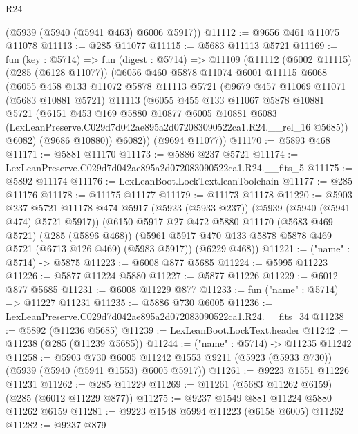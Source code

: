 \begin{lexlean}{R24}
\begin{coremodule}
    (@5939 (@5940 (@5941 @463) @6006 @5917))
@11112 := @9656 @461 @11075 @11078
@11113 := @285 @11077
@11115 := @5683 @11113 @5721
@11169 := fun (key : @5714) =>
  fun (digest : @5714) =>
  @11109
    (@11112
      (@6002 @11115)
      (@285 (@6128 @11077))
      (@6056
        @460
        @5878
        @11074
        @6001
        @11115
        @6068
        (@6055
          @458
          @133
          @11072
          @5878
          @11113
          @5721
          (@9679
            @457
            @11069
            @11071
            (@5683 @10881 @5721)
            @11113
            (@6055
              @455
              @133
              @11067
              @5878
              @10881
              @5721
              (@6151
                @453
                @169
                @5880
                @10877
                @6005
                @10881
                @6083
                (LexLeanPreserve.C029d7d042ae895a2d072083090522ca1.R24.__rel_16 @5685))
              @6082)
            (@9686 @10880))
          @6082))
      (@9694 @11077))
@11170 := @5893 @468
@11171 := @5881 @11170
@11173 := @5886 @237 @5721
@11174 := LexLeanPreserve.C029d7d042ae895a2d072083090522ca1.R24.__fits_5
@11175 := @5892 @11174
@11176 := LexLeanBoot.LockText.leanToolchain
@11177 := @285 @11176
@11178 := @11175 @11177
@11179 := @11173 @11178
@11220 := @5903
    @237
    @5721
    @11178
    @474
    @5917
    (@5923 (@5933 @237))
    (@5939 (@5940 (@5941 @474) @5721 @5917))
    (@6150
      @5917
      @27
      @472
      @5880
      @11170
      (@5683 @469 @5721)
      (@285 (@5896 @468))
      (@5961 @5917 @470 @133 @5878 @5878 @469 @5721 (@6713 @126 @469) (@5983 @5917))
      (@6229 @468))
@11221 := ("name" : @5714) -> @5875
@11223 := @6008 @877 @5685
@11224 := @5995 @11223
@11226 := @5877 @11224 @5880
@11227 := @5877 @11226
@11229 := @6012 @877 @5685
@11231 := @6008 @11229 @877
@11233 := fun ("name" : @5714) => @11227 @11231
@11235 := @5886 @730 @6005
@11236 := LexLeanPreserve.C029d7d042ae895a2d072083090522ca1.R24.__fits_34
@11238 := @5892 (@11236 @5685)
@11239 := LexLeanBoot.LockText.header
@11242 := @11238 (@285 (@11239 @5685))
@11244 := ("name" : @5714) -> @11235 @11242
@11258 := @5903
    @730
    @6005
    @11242
    @1553
    @9211
    (@5923 (@5933 @730))
    (@5939 (@5940 (@5941 @1553) @6005 @5917))
@11261 := @9223 @1551 @11226 @11231
@11262 := @285 @11229
@11269 := @11261 (@5683 @11262 @6159) (@285 (@6012 @11229 @877))
@11275 := @9237 @1549 @881 @11224 @5880 @11262 @6159
@11281 := @9223 @1548 @5994 @11223 (@6158 @6005) @11262
@11282 := @9237 @879

\end{coremodule}
\end{lexlean}
